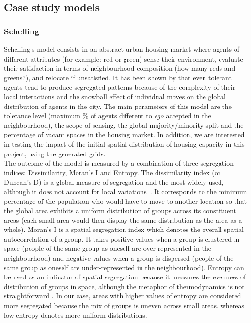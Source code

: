 \documentclass{JASSS}
\begin{document}
\subsection{Case study models}

\subsubsection{Schelling}
Schelling's model consists in an abstract urban housing market where agents of different attributes (for example: red or green) sense their environment, evaluate their satisfaction in terms of neighbourhood composition (how many reds and greens?), and relocate if unsatisfied. It has been shown by \cite{Schelling1969} that even tolerant agents tend to produce segregated patterns because of the complexity of their local interactions and the snowball effect of individual moves on the global distribution of agents in the city. The main parameters of this model are the tolerance level (maximum \% of agents different to {\it ego} accepted in the neighbourhood), the scope of sensing, the global majority/minority split and the percentage of vacant spaces in the housing market. In addition, we are interested in testing the impact of the initial spatial distribution of housing capacity in this project, using the generated grids. \\
The outcome of the model is measured by a combination of three segregation indices: Dissimilarity, Moran's I and Entropy. The dissimilarity index (or Duncan's D) is a global measure of segregation and the most widely used, although it does not account for local variations~\citep{white1986segregation, brown2006spatial}. It corresponds to the minimum percentage of the population who would have to move to another location so that the global area exhibits a uniform distribution of groups across its constituent areas (each small area would then display the same distribution as the area as a whole). Moran's I is a spatial segregation index which denotes the overall spatial autocorrelation of a group. It takes positive values when a group is clustered in space (people of the same group as oneself are over-represented in the neighbourhood) and negative values when a group is dispersed (people of the same group as oneself are under-represented in the neighbourhood). Entropy can be used as an indicator of spatial segregation because it measures the evenness of distribution of groups in space, although the metaphor of thermodynamics is not straightforward \citep{barner2017multiscale}. In our case, areas with higher values of entropy are considered more segregated because the mix of groups is uneven across small areas, whereas low entropy denotes more uniform distributions.\\
\end{document}
